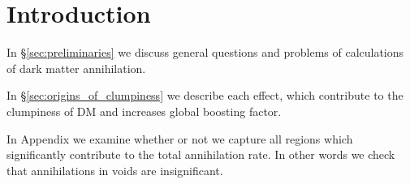 \section{Introduction}

In \S\ref{sec:preliminaries} we discuss general questions and problems of calculations of dark matter annihilation.

In \S\ref{sec:origins_of_clumpiness} we describe each effect, which contribute to the clumpiness of DM and increases global boosting factor.

In Appendix we examine whether or not we capture all regions which significantly contribute to the total annihilation rate. In other words we check that annihilations in voids are insignificant.
